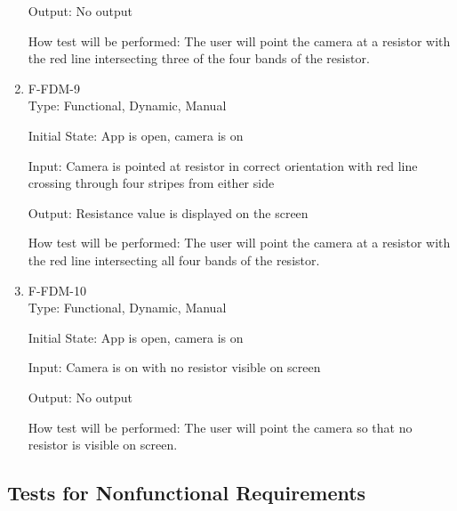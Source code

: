 \documentclass[12pt, titlepage]{article}
\begin{document}
\begin{enumerate}
Output: 
No output	

How test will be performed: 
The user will point the camera at a resistor with the red line intersecting three of the four bands of the resistor.

\item{F-FDM-9\\}
Type: Functional, Dynamic, Manual
					
Initial State: 
App is open, camera is on
					
Input: 
Camera is pointed at resistor in correct orientation with red line crossing through four stripes from either side
					
Output: 
Resistance value is displayed on the screen	

How test will be performed: 
The user will point the camera at a resistor with the red line intersecting all four bands of the resistor.

\item{F-FDM-10\\}
Type: Functional, Dynamic, Manual
					
Initial State: 
App is open, camera is on
					
Input: 
Camera is on with no resistor visible on screen
					
Output: 
No output

How test will be performed: 
The user will point the camera so that no resistor is visible on screen.

\end{enumerate}








\subsection{Tests for Nonfunctional Requirements}
\end{document}
